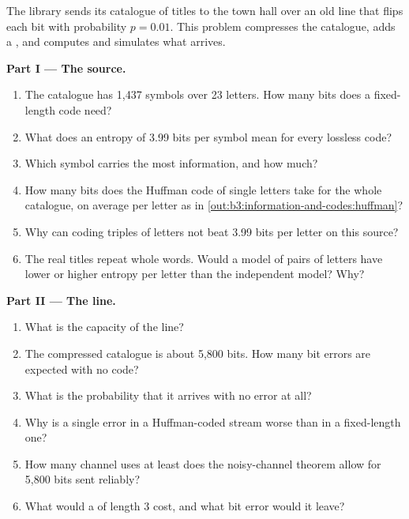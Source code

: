 \begin{problem}\label{pb:b3:information-and-codes:1}
The library sends its catalogue of titles to the town hall over an old line that flips each bit with probability $p = 0.01$. This problem compresses the catalogue, adds a , and computes and simulates what arrives.

\medskip\noindent\textbf{Part I --- The source.}
\begin{enumerate}
  \item The catalogue has 1,437 symbols over 23 letters. How many bits does a fixed-length code need?
  \item What does an entropy of 3.99 bits per symbol mean for every lossless code?
  \item Which symbol carries the most information, and how much?
  \item How many bits does the Huffman code of single letters take for the whole catalogue, on average per letter as in \cref{out:b3:information-and-codes:huffman}?
  \item Why can coding triples of letters not beat 3.99 bits per letter on this source?
  \item The real titles repeat whole words. Would a model of pairs of letters have lower or higher entropy per letter than the independent model? Why?
\end{enumerate}

\medskip\noindent\textbf{Part II --- The line.}
\begin{enumerate}[resume]
  \item What is the capacity of the line?
  \item The compressed catalogue is about 5,800 bits. How many bit errors are expected with no code?
  \item What is the probability that it arrives with no error at all?
  \item Why is a single error in a Huffman-coded stream worse than in a fixed-length one?
  \item How many channel uses at least does the noisy-channel theorem allow for 5,800 bits sent reliably?
  \item What would a  of length 3 cost, and what bit error would it leave?
\end{enumerate}


\end{problem}
